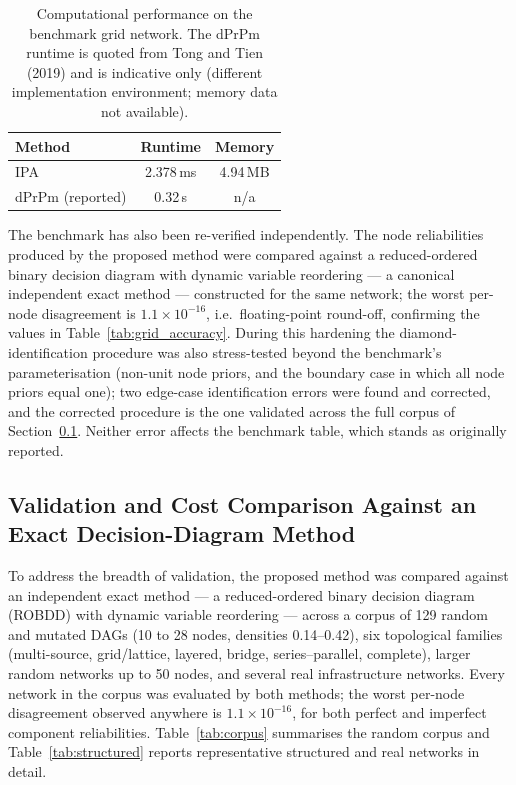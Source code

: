 \documentclass[preprint,12pt]{elsarticle}
\theoremstyle{definition}
\begin{document}
\begin{table}[t]
\centering\small
\caption{Computational performance on the benchmark grid network. The dPrPm runtime is quoted from Tong
and Tien (2019) and is indicative only (different implementation environment; memory data not
available).}
\label{tab:grid_runtime}
\begin{tabular}{lcc}
\toprule
Method & Runtime & Memory\\
\midrule
IPA & 2.378\,ms & 4.94\,MB\\
dPrPm (reported) & 0.32\,s & n/a\\
\bottomrule
\end{tabular}
\end{table}

The benchmark has also been re-verified independently. The node reliabilities produced by the proposed
method were compared against a reduced-ordered binary decision diagram with dynamic variable reordering
--- a canonical independent exact method --- constructed for the same network; the worst per-node
disagreement is $1.1\times10^{-16}$, i.e.\ floating-point round-off, confirming the values in
Table~\ref{tab:grid_accuracy}. During this hardening the diamond-identification procedure was also
stress-tested beyond the benchmark's parameterisation (non-unit node priors, and the boundary case in
which all node priors equal one); two edge-case identification errors were found and corrected, and the
corrected procedure is the one validated across the full corpus of Section~\ref{sec:comparison}. Neither
error affects the benchmark table, which stands as originally reported.

\subsection{Validation and Cost Comparison Against an Exact Decision-Diagram Method}\label{sec:comparison}

To address the breadth of validation, the proposed method was compared against an independent exact
method --- a reduced-ordered binary decision diagram (ROBDD) with dynamic variable reordering --- across
a corpus of 129 random and mutated DAGs (10 to 28 nodes, densities 0.14--0.42), six topological families
(multi-source, grid/lattice, layered, bridge, series--parallel, complete), larger random networks up to
50 nodes, and several real infrastructure networks. Every network in the corpus was evaluated by both
methods; the worst per-node disagreement observed anywhere is $1.1\times10^{-16}$, for both perfect and
imperfect component reliabilities. Table~\ref{tab:corpus} summarises the random corpus and
Table~\ref{tab:structured} reports representative structured and real networks in detail.
\end{document}

